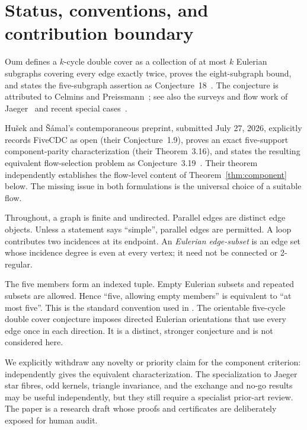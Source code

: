 \documentclass[11pt]{article}
\theoremstyle{definition}
\theoremstyle{remark}
\newcommand{\1}{\mathbf 1}
\begin{document}
\tableofcontents

\section{Status, conventions, and contribution boundary}

Oum defines a \(k\)-cycle double cover as a collection of at most \(k\)
Eulerian subgraphs covering every edge exactly twice, proves the
eight-subgraph bound, and states the five-subgraph assertion as
Conjecture~18~\cite{Oum2026}.  The conjecture is attributed to Celmins and
Preissmann~\cite{Celmins1985,Preissmann1981}; see also the surveys and flow
work of Jaeger~\cite{Jaeger1979,Jaeger1985,Jaeger1988} and recent special
cases~\cite{LiuEtAl2023,HuckKochol1995}.

Hu\v{s}ek and \v{S}\'amal's contemporaneous preprint, submitted July 27,
2026, explicitly records FiveCDC as open (their Conjecture~1.9), proves an
exact five-support component-parity characterization (their
Theorem~3.16), and states the resulting equivalent flow-selection problem
as Conjecture~3.19~\cite{HusekSamal2026}.  Their theorem independently
establishes the flow-level content of
Theorem~\ref{thm:component} below.  The missing issue in both formulations
is the universal choice of a suitable flow.

Throughout, a graph is finite and undirected.  Parallel edges are distinct
edge objects.  Unless a statement says ``simple'', parallel edges are
permitted.  A loop contributes two incidences at its endpoint.  An
\emph{Eulerian edge-subset} is an edge set whose incidence degree is even at
every vertex; it need not be connected or 2-regular.

The five members form an indexed tuple.  Empty Eulerian subsets and repeated
subsets are allowed.  Hence ``five, allowing empty members'' is equivalent
to ``at most five''.  This is the standard convention used in
\cite{Oum2026}.  The orientable five-cycle double cover conjecture imposes
directed Eulerian orientations that use every edge once in each direction.
It is a distinct, stronger conjecture and is not considered here.

We explicitly withdraw any novelty or priority claim for the component
criterion: \cite[Theorem~3.16]{HusekSamal2026} independently gives the
equivalent characterization.  The specialization to Jaeger star fibres,
odd kernels, triangle invariance, and the exchange and no-go results may be
useful independently, but they still require a specialist prior-art review.
The paper is a research draft whose proofs and certificates are deliberately
exposed for human audit.
\end{document}
